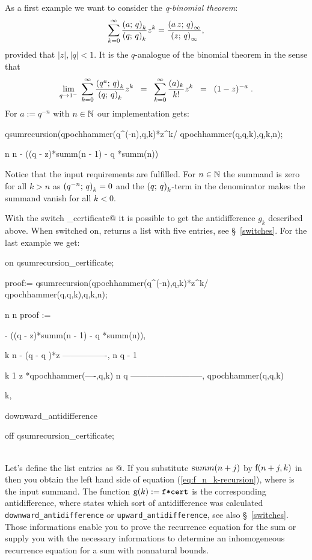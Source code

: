 As a first example we want to consider the {\sl q-binomial theorem}:
\[
	\sum_{k=0}^\infty{\frac{\left(a;\,q\right)_{k}}{\left(q;\,q\right)_{k}}z^k} =
	\frac{\left(a\,z;\,q\right)_{\infty}}{\left(z;\,q\right)_{\infty}},
\]
provided that $|z|,|q|<1$.
It is the $q$-analogue of the binomial theorem in the sense that
\[
	\lim_{q\rightarrow{}1^-}\;{\sum_{k=0}^\infty{
	\frac{\left(q^a;\,q\right)_{k}}{\left(q;\,q\right)_{k}}z^k}} \;\;=\;\; 
	\sum_{k=0}^\infty{\frac{(a)_k}{k!}z^k} \;\;=\;\; (1-z)^{-a}\;.
\]
For $a:=q^{-n}$ with $n\in\Bbb N$ our implementation gets:
\begin{redoutput}
\redprompt qsumrecursion(qpochhammer(q^(-n),q,k)*z^k/
   qpochhammer(q,q,k),q,k,n);

      n                     n
 - ((q  - z)*summ(n - 1) - q *summ(n))
\end{redoutput}
%
Notice that the input requirements are fulfilled. For $n\in\Bbb N$ the
summand is zero for all $k>n$ as $\left(q^{-n};\,q\right)_{k}=0$ and 
the $\left(q;\,q\right)_{k}$-term in the denominator makes the summand
vanish for all $k<0$.

With the switch \verb@qsumrecursion_certificate@ it is possible
to get the antidifference $g_k$ described above. When switched
on, \verb@qsumrecursion@ returns a list with five entries,
see \S~\ref{switches}. For the
last example we get:

\begin{redoutput}
\redprompt on qsumrecursion_certificate;

\redprompt proof:= qsumrecursion(qpochhammer(q^(-n),q,k)*z^k/
    qpochhammer(q,q,k),q,k,n);

                n                     n
proof := { - ((q  - z)*summ(n - 1) - q *summ(n)),

                k    n
            - (q  - q )*z
          ----------------,
                n
               q  - 1

            k              1
           z *qpochhammer(----,q,k)
                            n
                           q
          --------------------------,
              qpochhammer(q,q,k)

          k,

          downward_antidifference}

\redprompt off qsumrecursion_certificate;
\end{redoutput}
%
\\[-2.5ex]\noindent{}
Let's define the list entries as @. If you
substitute ${\mathrm summ}(n+j)$ by ${\mathrm f}(n+j,k)$ in \verb@rec@ then
you obtain the left hand side of equation (\ref{eq:f_n_k-recursion}),
where \verb@f@ is the input summand. The function
$\fcn{g}{k}:=\verb@f*cert@$ is the corresponding
antidifference, where \verb@dir@ states which sort of antidifference
was calculated {\tt downward\_antidifference} or 
{\tt upward\_antidifference}, see also \S~\ref{switches}.
Those informations enable you to prove the recurrence equation for
the sum or supply you with the necessary informations to determine
an inhomogeneous recurrence equation for a sum with nonnatural bounds.

